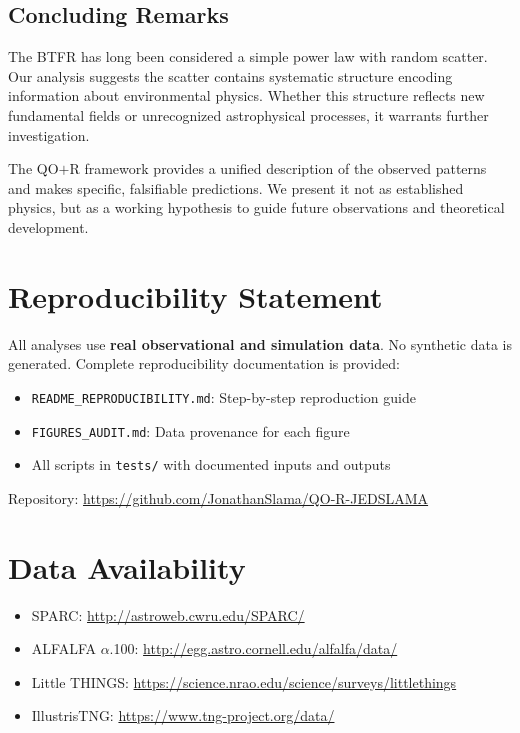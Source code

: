 \documentclass[12pt,a4paper]{article}
\newcommand{\QOR}{QO$+$R}
\begin{document}
\subsection{Concluding Remarks}

The BTFR has long been considered a simple power law with random scatter. Our analysis suggests the scatter contains systematic structure encoding information about environmental physics. Whether this structure reflects new fundamental fields or unrecognized astrophysical processes, it warrants further investigation.

The \QOR{} framework provides a unified description of the observed patterns and makes specific, falsifiable predictions. We present it not as established physics, but as a working hypothesis to guide future observations and theoretical development.

\section*{Reproducibility Statement}

All analyses use \textbf{real observational and simulation data}. No synthetic data is generated. Complete reproducibility documentation is provided:

\begin{itemize}
    \item \texttt{README\_REPRODUCIBILITY.md}: Step-by-step reproduction guide
    \item \texttt{FIGURES\_AUDIT.md}: Data provenance for each figure
    \item All scripts in \texttt{tests/} with documented inputs and outputs
\end{itemize}

Repository: \url{https://github.com/JonathanSlama/QO-R-JEDSLAMA}

\section*{Data Availability}

\begin{itemize}
    \item SPARC: \url{http://astroweb.cwru.edu/SPARC/}
    \item ALFALFA $\alpha$.100: \url{http://egg.astro.cornell.edu/alfalfa/data/}
    \item Little THINGS: \url{https://science.nrao.edu/science/surveys/littlethings}
    \item IllustrisTNG: \url{https://www.tng-project.org/data/}
\end{itemize}
\end{document}
